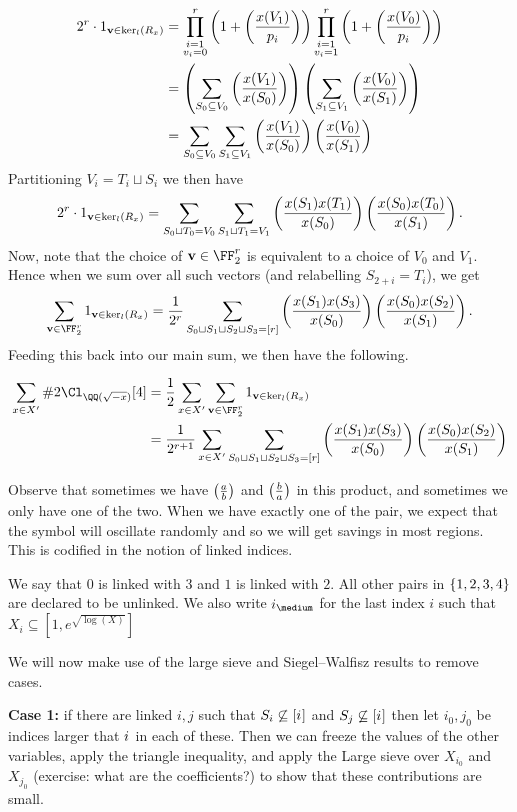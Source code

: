 \documentclass{lecturenotes}
\newcommand{\bv}{\mathbf{v}}
\newcommand{\kerl}{\ker_{l}}
\numberwithin{equation}{section}
\begin{document}
\begin{align*}
    2^r\cdot1_{\bv\in \kerl(R_x)}
    &=\prod_{\substack{i=1\\v_i=0}}^r\braces{1+\art{x(V_1)}{p_i}}
    \prod_{\substack{i=1\\v_i=1}}^r\braces{1+\art{x(V_0)}{p_i}}
    \\&=
    \braces{\sum_{S_0\subseteq V_0}\art{x(V_1)}{x(S_0)}}
    \braces{\sum_{S_1\subseteq V_1}\art{x(V_0)}{x(S_1)}}
    \\&=
    \sum_{S_0\subseteq V_0}\sum_{S_1\subseteq V_1}\art{x(V_1)}{x(S_0)}\art{x(V_0)}{x(S_1)}
\end{align*}
Partitioning $V_i=T_i\sqcup S_i$ we then have
\[2^r\cdot 1_{\bv\in \kerl(R_x)}=\sum_{S_0\sqcup T_0=V_0}\sum_{S_1\sqcup T_1=V_1}\art{x(S_1)x(T_1)}{x(S_0)}\art{x(S_0)x(T_0)}{x(S_1)}.\]
Now, note that the choice of $\bv\in \FF_2^r$ is equivalent to a choice of $V_0$ and $V_1$.  Hence when we sum over all such vectors (and relabelling $S_{2+i}=T_i$), we get
\[\sum_{\bv\in\FF_2^r}1_{\bv\in \kerl(R_x)}=\frac{1}{2^r}\sum_{S_0\sqcup S_1\sqcup S_2\sqcup S_3=[r]}\art{x(S_1)x(S_3)}{x(S_0)}\art{x(S_0)x(S_2)}{x(S_1)}.\]
Feeding this back into our main sum, we then have the following.

\begin{align*}
    \sum_{x\in X'}\#2\Cl_{\QQ(\sqrt{-x})}[4]
    &=\frac{1}{2}\sum_{x\in X'}\sum_{\bv\in \FF_2^r}1_{\bv\in \kerl(R_x)}
    \\&=\frac{1}{2^{r+1}}
    \sum_{x\in X'}
    \sum_{S_0\sqcup S_1\sqcup S_2\sqcup S_3=[r]}\art{x(S_1)x(S_3)}{x(S_0)}\art{x(S_0)x(S_2)}{x(S_1)}
\end{align*}


Observe that sometimes we have $\left(\frac{a}{b}\right)$ and $\left(\frac{b}{a}\right)$ in this product, and sometimes we only have one of the two.  When we have exactly one of the pair, we expect that the symbol will oscillate randomly and so we will get savings in most regions.  This is codified in the notion of linked indices.
\begin{definition}
    We say that $0$ is linked with $3$ and $1$ is linked with $2$.  All other pairs in $\left\{{1,2,3,4}\right\}$ are declared to be unlinked.  We also write $i_{\medium}$ for the last index $i$ such that $X_i\subseteq [1,e^{\sqrt{\log(X)}}]$
\end{definition}

We will now make use of the large sieve and Siegel--Walfisz results to remove cases.

\textbf{Case 1:} if there are linked $i,j$ such that $S_i\not\subseteq [i_{\small}]$ and $S_j\not\subseteq [i_{\small}]$ then let $i_0,j_0$ be indices larger that $i_{\small}$ in each of these.  Then we can freeze the values of the other variables, apply the triangle inequality, and apply the Large sieve over $X_{i_0}$ and $X_{j_0}$ (exercise: what are the coefficients?) to show that these contributions are small.
\end{document}
